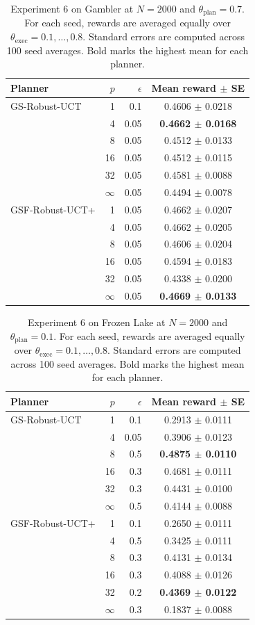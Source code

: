 \begin{table}[htbp]
\centering
\caption{Experiment 6 on Gambler at $N=2000$ and $\theta_{\mathrm{plan}}=0.7$. For each seed, rewards are averaged equally over $\theta_{\mathrm{exec}}=0.1,\ldots,0.8$. Standard errors are computed across 100 seed averages. Bold marks the highest mean for each planner.}
\label{tab:exp6-gambler}
\begin{tabular}{lrrc}
\toprule
Planner & $p$ & $\epsilon$ & Mean reward $\pm$ SE \\
\midrule
GS-Robust-UCT & 1 & 0.1 & 0.4606 $\pm$ 0.0218 \\
 & 4 & 0.05 & \textbf{0.4662 $\pm$ 0.0168} \\
 & 8 & 0.05 & 0.4512 $\pm$ 0.0133 \\
 & 16 & 0.05 & 0.4512 $\pm$ 0.0115 \\
 & 32 & 0.05 & 0.4581 $\pm$ 0.0088 \\
 & $\infty$ & 0.05 & 0.4494 $\pm$ 0.0078 \\
\midrule
GSF-Robust-UCT+ & 1 & 0.05 & 0.4662 $\pm$ 0.0207 \\
 & 4 & 0.05 & 0.4662 $\pm$ 0.0205 \\
 & 8 & 0.05 & 0.4606 $\pm$ 0.0204 \\
 & 16 & 0.05 & 0.4594 $\pm$ 0.0183 \\
 & 32 & 0.05 & 0.4338 $\pm$ 0.0200 \\
 & $\infty$ & 0.05 & \textbf{0.4669 $\pm$ 0.0133} \\
\bottomrule
\end{tabular}
\end{table}

\begin{table}[htbp]
\centering
\caption{Experiment 6 on Frozen Lake at $N=2000$ and $\theta_{\mathrm{plan}}=0.1$. For each seed, rewards are averaged equally over $\theta_{\mathrm{exec}}=0.1,\ldots,0.8$. Standard errors are computed across 100 seed averages. Bold marks the highest mean for each planner.}
\label{tab:exp6-frozen-lake}
\begin{tabular}{lrrc}
\toprule
Planner & $p$ & $\epsilon$ & Mean reward $\pm$ SE \\
\midrule
GS-Robust-UCT & 1 & 0.1 & 0.2913 $\pm$ 0.0111 \\
 & 4 & 0.05 & 0.3906 $\pm$ 0.0123 \\
 & 8 & 0.5 & \textbf{0.4875 $\pm$ 0.0110} \\
 & 16 & 0.3 & 0.4681 $\pm$ 0.0111 \\
 & 32 & 0.3 & 0.4431 $\pm$ 0.0100 \\
 & $\infty$ & 0.5 & 0.4144 $\pm$ 0.0088 \\
\midrule
GSF-Robust-UCT+ & 1 & 0.1 & 0.2650 $\pm$ 0.0111 \\
 & 4 & 0.5 & 0.3425 $\pm$ 0.0111 \\
 & 8 & 0.3 & 0.4131 $\pm$ 0.0134 \\
 & 16 & 0.3 & 0.4088 $\pm$ 0.0126 \\
 & 32 & 0.2 & \textbf{0.4369 $\pm$ 0.0122} \\
 & $\infty$ & 0.3 & 0.1837 $\pm$ 0.0088 \\
\bottomrule
\end{tabular}
\end{table}
